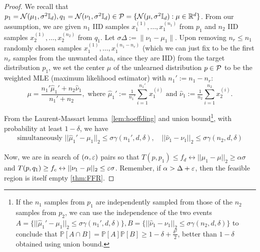\samples*
\begin{proof}
    We recall that $p_1 = \mathcal{N}(\mu_1 , \sigma^2\mathbb{I}_d), q_1 = \mathcal{N}(\nu_1 , \sigma^2\mathbb{I}_d) \in \mathcal{P}= \{\mathcal{N}(\mu, \sigma^2\mathbb{I}_d): \mu \in \mathbb{R}^d\}$.  
    From our assumption, we are given $n_1$ IID samples $x_1^{(1)}, \ldots, x_1^{(n_1)}$ from $p_1$ and $n_2$ IID samples $x_2^{(1)}, \ldots, x_2^{(n_2)}$  from $q_1$. Let $\sigma \Delta:=\|\nu_1-\mu_1\|$. Upon removing $n_r \leq n_1$ randomly chosen samples $x_1^{(1)}, \ldots, x_1^{(n_1 - n_r)}$ (which we can just fix to be the first $n_r$ samples from the unwanted data, since they are IID) from the target distribution $p_1$, we set the center $\mu$ of the unlearned distribution $p\in \mathcal{P}$ to be the weighted MLE (maximum likelihood estimator) with $n_1':= n_1-n_r$:
    \begin{equation}
        \mu = \frac{n_1' \hat{\mu}_1' + n_2 \hat{\nu}_1}{n_1' + n_2}, \text{ where }
        \hat{\mu}_1' := \tfrac{1}{n_1'} \sum_{i=1}^{n_1'} x_1^{(i)} \text{ and } \hat{\nu}_1 := \tfrac{1}{n_2} \sum_{i=1}^{n_2} x_2^{(i)}.
    \end{equation}
 
    From the Laurent-Massart  lemma~\ref{lem:hoeffding} and union bound\footnote{If the $n_1$ samples from $p_1$ are independently sampled from those of the $n_2$ samples from $p_2$, we can use the independence of the two events $A=\{||\hat{\mu}_1' - \mu_1||_2 \leq \sigma \gamma(n_1', d, \delta)\}, B=\{||\hat{\nu}_1 - \nu_1||_2 \leq \sigma \gamma(n_2, d,\delta)\}$ to conclude that $\mathbb{P}[A\cap B]= \mathbb{P}[A] \mathbb{P}[B] \geq 1- \delta + \frac{\delta^2}{2}$, better than $1-\delta$ obtained using union bound.},  with probability at least $1- \delta$, we  have 
    \begin{align}
       \text{simultaneously } ||\hat{\mu}_1' - \mu_1||_2 \leq \sigma \gamma(n_1', d, \delta), \quad ||\hat{\nu}_1 - \nu_1||_2 \leq \sigma \gamma(n_2, d,\delta)
        \label{eq:hoeffding}
    \end{align}
    
Now, we are in search of $(\alpha, \varepsilon)$ pairs so that $T(p,p_1) \leq f_d \leftrightarrow ||\mu_1-\mu||_2 \geq \alpha \sigma  $ and $T(p,q_1) \geq f_c \leftrightarrow ||\nu_1-\mu||_2 \leq \varepsilon \sigma $. Remember, if $\alpha >\Delta +\varepsilon$, then the feasible region is itself empty \ref{thm:FFR}.


\end{proof}
